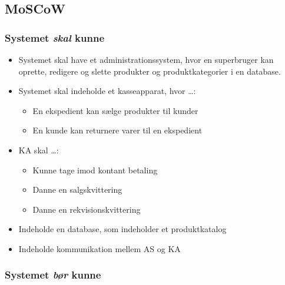 \subsection{MoSCoW}

\subsubsection*{Systemet \textit{skal} kunne}

\begin{itemize}

\item Systemet skal have et administrationssystem, hvor en superbruger kan oprette, redigere og slette produkter og produktkategorier i en database.
\item Systemet skal indeholde et kasseapparat, hvor …:
\begin{itemize}
\item En ekspedient kan sælge produkter til kunder
\item En kunde kan returnere varer til en ekspedient
\end{itemize}
\item \gls{KA} skal …:
\begin{itemize}
\item Kunne tage imod kontant betaling
\item Danne en salgskvittering
\item Danne en rekvisionskvittering
\end{itemize}
\item Indeholde en database, som indeholder et produktkatalog
\item Indeholde kommunikation mellem \gls{AS} og \gls{KA}

\end{itemize}


\subsubsection*{Systemet \textit{bør} kunne}


